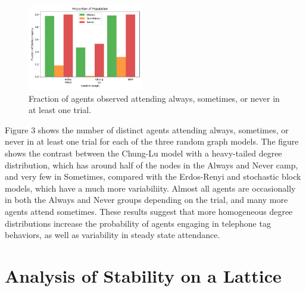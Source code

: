 \documentclass[12pt]{article}
\begin{document}
\begin{figure}[h!]
\includegraphics[width=0.45\textwidth]{always_sometimes_never.png}
\caption{Fraction of agents observed attending always, sometimes, or never in at least one trial.}
\end{figure}

Figure 3 shows the number of distinct agents attending always, sometimes, or never in at least one trial for each of the three random graph models.  The figure shows the contrast between the Chung-Lu model with a heavy-tailed degree distribution, which has around half of the nodes in the Always and Never camp, and very few in Sometimes, compared with the Erdos-Renyi and stochastic block models, which have a much more variabiliity.  Almost all agents are occasionally in both the Always and Never groups depending on the trial, and many more agents attend sometimes.  These results suggest that more homogeneous degree distributions increase the probability of agents engaging in telephone tag behaviors, as well as variability in steady state attendance.

\section{Analysis of Stability on a Lattice}
\end{document}
